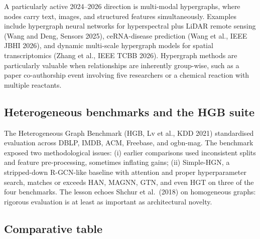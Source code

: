 A particularly active 2024--2026 direction is multi-modal hypergraphs, where nodes carry text, images, and structured features simultaneously. Examples include hypergraph neural networks for hyperspectral plus LiDAR remote sensing (Wang and Deng, Sensors 2025), ceRNA-disease prediction (Wang et al., IEEE JBHI 2026), and dynamic multi-scale hypergraph models for spatial transcriptomics (Zhang et al., IEEE TCBB 2026). Hypergraph methods are particularly valuable when relationships are inherently group-wise, such as a paper co-authorship event involving five researchers or a chemical reaction with multiple reactants.

\subsection{Heterogeneous benchmarks and the HGB suite}\label{heterogeneous-benchmarks-and-the-hgb-suite}

The Heterogeneous Graph Benchmark (HGB, Lv et al., KDD 2021) standardised evaluation across DBLP, IMDB, ACM, Freebase, and ogbn-mag. The benchmark exposed two methodological issues: (i) earlier comparisons used inconsistent splits and feature pre-processing, sometimes inflating gains; (ii) Simple-HGN, a stripped-down R-GCN-like baseline with attention and proper hyperparameter search, matches or exceeds HAN, MAGNN, GTN, and even HGT on three of the four benchmarks. The lesson echoes Shchur et al.~(2018) on homogeneous graphs: rigorous evaluation is at least as important as architectural novelty.

\subsection{Comparative table}\label{comparative-table}

